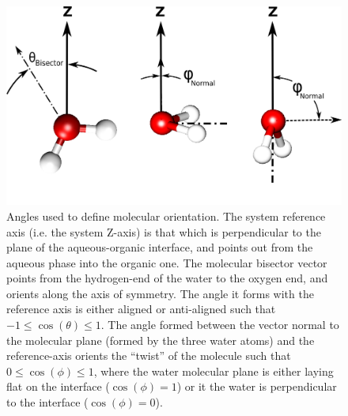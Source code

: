 \begin{figure}[h!]
\begin{center}
	\includegraphics[scale=0.3]{images/water-angles.png}
	\caption{Angles used to define molecular orientation. The system reference axis (i.e. the system Z-axis) is that which is perpendicular to the plane of the aqueous-organic interface, and points out from the aqueous phase into the organic one. The molecular bisector vector points from the hydrogen-end of the water to the oxygen end, and orients along the axis of symmetry. The angle it forms with the reference axis is either aligned or anti-aligned such that $-1\le \cos(\theta) \le 1$. The angle formed between the vector normal to the molecular plane (formed by the three water atoms) and the reference-axis orients the ``twist'' of the molecule such that $0 \le \cos(\phi) \le 1$, where the water molecular plane is either laying flat on the interface ($\cos(\phi)=1$) or it the water is perpendicular to the interface ($\cos(\phi)=0$).}
	\label{fig:water-angles}
\end{center}
\end{figure}



